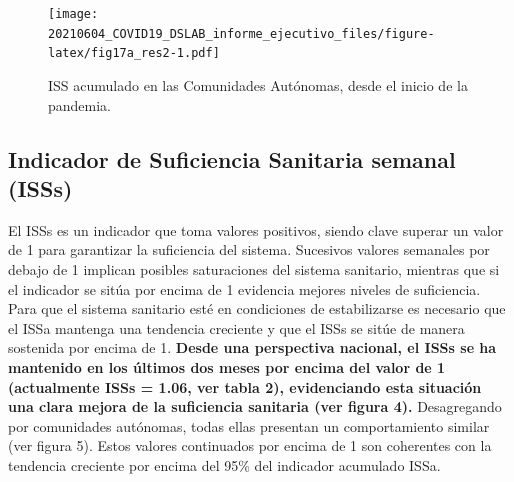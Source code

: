 \documentclass[
  11pt,
]{article}
\begin{document}
\vspace{0.2cm}

\begin{figure}
\centering
\texttt{[image: 20210604\_COVID19\_DSLAB\_informe\_ejecutivo\_files/figure-latex/fig17a\_res2-1.pdf]}
\caption{\label{fig:fig17a_res} ISS acumulado en las Comunidades
Autónomas, desde el inicio de la pandemia.}
\end{figure}

\newpage
\setcounter{page}{6}

\hypertarget{indicador-de-suficiencia-sanitaria-semanal-isss}{%
\subsection{Indicador de Suficiencia Sanitaria semanal
(ISSs)}\label{indicador-de-suficiencia-sanitaria-semanal-isss}}

El ISSs es un indicador que toma valores positivos, siendo clave superar
un valor de 1 para garantizar la suficiencia del sistema. Sucesivos
valores semanales por debajo de 1 implican posibles saturaciones del
sistema sanitario, mientras que si el indicador se sitúa por encima de 1
evidencia mejores niveles de suficiencia. Para que el sistema sanitario
esté en condiciones de estabilizarse es necesario que el ISSa mantenga
una tendencia creciente y que el ISSs se sitúe de manera sostenida por
encima de 1. \textbf{Desde una perspectiva nacional, el ISSs se ha
mantenido en los últimos dos meses por encima del valor de 1
(actualmente ISSs = 1.06, ver tabla 2), evidenciando esta situación una
clara mejora de la suficiencia sanitaria (ver figura 4).} Desagregando
por comunidades autónomas, todas ellas presentan un comportamiento
similar (ver figura 5). Estos valores continuados por encima de 1 son
coherentes con la tendencia creciente por encima del 95\% del indicador
acumulado ISSa.
\end{document}
